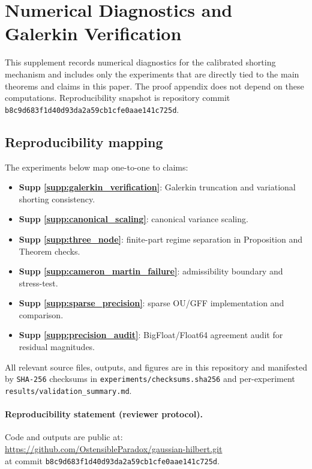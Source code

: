
\section{Numerical Diagnostics and Galerkin Verification}
\label{supp:numerical}

This supplement records numerical diagnostics for the calibrated shorting
mechanism and includes only the experiments that are directly tied to the main
theorems and claims in this paper.
The proof appendix does not depend on these computations.
Reproducibility snapshot is repository commit
\texttt{b8c9d683f1d40d93da2a59cb1cfe0aae141c725d}.

\subsection*{Reproducibility mapping}
\label{supp:repro_mapping}
The experiments below map one-to-one to claims:
\begin{itemize}
    \item \textbf{Supp \ref{supp:galerkin_verification}}: Galerkin truncation
    and variational shorting consistency.
    \item \textbf{Supp \ref{supp:canonical_scaling}}: canonical variance scaling.
    \item \textbf{Supp \ref{supp:three_node}}: finite-part regime separation in
    Proposition and Theorem checks.
    \item \textbf{Supp \ref{supp:cameron_martin_failure}}: admissibility
    boundary and stress-test.
    \item \textbf{Supp \ref{supp:sparse_precision}}: sparse OU/GFF implementation
    and comparison.
    \item \textbf{Supp \ref{supp:precision_audit}}: BigFloat/Float64 agreement
    audit for residual magnitudes.
\end{itemize}

All relevant source files, outputs, and figures are in this repository and
manifested by \texttt{SHA-256} checksums in
\texttt{experiments/checksums.sha256} and per-experiment
\texttt{results/validation\_summary.md}.

\paragraph{Reproducibility statement (reviewer protocol).}
Code and outputs are public at: \\
\url{https://github.com/OstensibleParadox/gaussian-hilbert.git} \\
at commit \texttt{b8c9d683f1d40d93da2a59cb1cfe0aae141c725d}.


